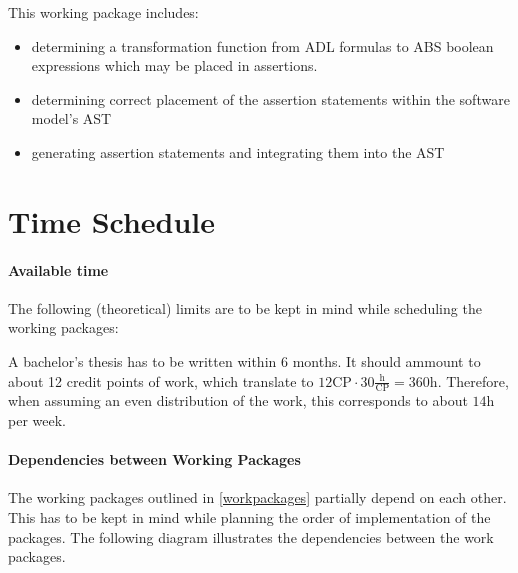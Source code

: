 \documentclass[paper=a4,nochapname,accentcolor=tud9c]{tudexercise}
\begin{document}
\begin{enumdescript}
    This working package includes:
    \begin{itemize}
      \item determining a transformation function from ADL formulas to ABS
        boolean expressions which may be placed in assertions.
      \item determining correct placement of the assertion statements within
        the software model's AST
      \item generating assertion statements and integrating them into the AST
    \end{itemize}
\end{enumdescript}

\section{Time Schedule}

\paragraph{Available time}
%
The following (theoretical) limits are to be kept in mind while scheduling the
working packages:

A bachelor's thesis has to be written within 6 months.
It should ammount to about 12 credit points of work, which translate to $12 \mathrm{CP} \cdot 30 \frac{\mathrm{h}}{\mathrm{CP}} = 360 \mathrm{h}$.
Therefore, when assuming an even distribution of the work, this corresponds to about $14 \mathrm{h}$ per week.

\paragraph{Dependencies between Working Packages}

The working packages outlined in \ref{workpackages} partially depend on each other.
This has to be kept in mind while planning the order of implementation of the
packages. The following diagram illustrates the dependencies between the work
packages.

\medskip
\end{document}
